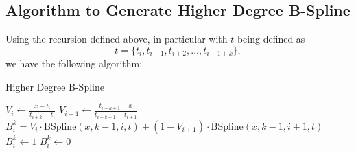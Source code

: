 \documentclass[letterpaper]{article}
\begin{document}
\subsection{Algorithm to Generate Higher Degree B-Spline}
Using the recursion defined above, in particular with $t$ being defined as 
\[t = \{t_i, t_{i + 1}, t_{i + 2}, \hdots, t_{i + 1 + k}\},\]
we have the following algorithm:
\begin{algorithm}[H]
    \caption{Higher Degree B-Spline}
    \begin{algorithmic}[1]
                \State $V_{i} \gets \frac{x - t_i}{t_{i + k} - t_i}$
                \State $V_{i + 1} \gets \frac{t_{i + k + 1} - x}{t_{i + k + 1} - t_{i + 1}}$
                \State $B_{i}^{k} = V_{i} \cdot \text{BSpline}(x, k - 1, i, t) + (1 - V_{i + 1}) \cdot \text{BSpline}(x, k - 1, i + 1, t)$
            \Else {}
                    \State $B_{i}^{k} \gets 1$
                \Else 
                    \State $B_{i}^{k} \gets 0$
                \EndIf  
            \EndIf 
        \EndFunction 
    \end{algorithmic}
\end{algorithm}
\end{document}
